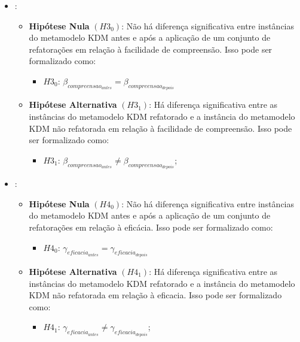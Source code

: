 \begin{itemize}
\item {}:

\begin{itemize}
\item \textbf{Hipótese Nula} \textbf{$(H3_{0})$}: Não há diferença significativa entre instâncias do metamodelo KDM antes e após a aplicação de um conjunto de refatorações em relação à facilidade de compreensão. Isso pode ser formalizado como: 

\begin{itemize}
\item $H3_{0}$: $\beta_{compreensao_{antes}} = \beta_{compreensao_{depois}}$
\end{itemize}

\item \textbf{Hipótese Alternativa} \textbf{$(H3_{1})$}: Há diferença significativa entre as instâncias do metamodelo KDM refatorado e a instância do metamodelo KDM não refatorada em relação à facilidade de compreensão. Isso pode ser formalizado como: 

\begin{itemize}
\item $H3_{1}$: $\beta_{compreensao_{antes}} \neq \beta_{compreensao_{depois}}$;
\end{itemize}
\end{itemize}

\item {}:
    
    \begin{itemize}
\item \textbf{Hipótese Nula} \textbf{$(H4_{0})$}: Não há diferença significativa entre instâncias do metamodelo KDM antes e após a aplicação de um conjunto de refatorações em relação à eficácia. Isso pode ser formalizado como: 

\begin{itemize}
\item $H4_{0}$: $\gamma_{eficacia_{antes}} = \gamma_{eficacia_{depois}}$
\end{itemize}

\item \textbf{Hipótese Alternativa} \textbf{$(H4_{1})$}: Há diferença significativa entre as instâncias do metamodelo KDM refatorado e a instância do metamodelo KDM não refatorada em relação à eficacia. Isso pode ser formalizado como: 

\begin{itemize}
\item $H4_{1}$: $\gamma_{eficacia_{antes}} \neq \gamma_{eficacia_{depois}}$;
\end{itemize}
\end{itemize}

\end{itemize}

